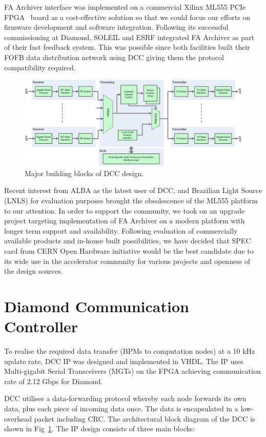 \documentclass[a4paper,
              ]{jacow}
\begin{document}
FA Archiver interface was implemented on a commercial Xilinx ML555 PCIe FPGA~\cite{ML555} board as a cost-effective solution so that we could focus our efforts on firmware development and software integration. Following its successful commissioning at Diamond, SOLEIL and ESRF integrated FA Archiver as part of their fast feedback system. This was possible since both facilities built their FOFB data distribution network using DCC giving them the protocol compatibility required.

\begin{figure}[t!]
   \centering
   \includegraphics[width=140mm]{img/WEPGF089f3}
   \caption{Major building blocks of DCC design.}
   \label{DCC}
\end{figure}

Recent interest from ALBA as the latest user of DCC, and Brazilian Light Source (LNLS) for evaluation purposes brought the obsolescence of the ML555 platform to our attention. In order to support the community, we took on an upgrade project targeting implementation of FA Archiver on a modern platform with longer term support and availability. Following evaluation of commercially available products and in-house built possibilities, we have decided that SPEC card from CERN Open Hardware initiative would be the best candidate due to its wide use in the accelerator community for various projects and openness of the design sources.

\section{Diamond Communication Controller}

To realise the required data transfer (BPMs to computation nodes) at a 10 kHz update rate, DCC IP was designed and implemented in VHDL. The IP uses Multi-gigabit Serial Transceivers (MGTs) on the FPGA achieving communication rate of 2.12 Gbps for Diamond.

DCC utilises a data-forwarding protocol whereby each node forwards its own data, plus each piece of incoming data once. The data is encapsulated in a low-overhead packet including CRC. The architectural block diagram of the DCC is shown in Fig~\ref{DCC}. The IP design consists of three main blocks:
\end{document}
